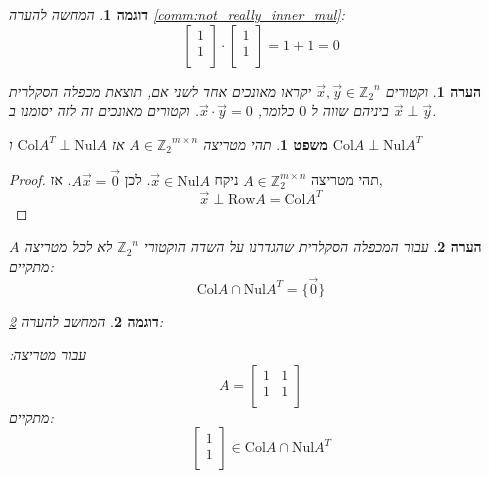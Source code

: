 \documentclass[12pt,leqno]{article}
\theoremstyle{theoremdd}
\newtheorem{theorem}{משפט}[section]
\newtheorem{example}{דוגמה}[section]
\newtheorem{comm}{הערה}[section]
\newcommand{\Zn}{{\mathbb{Z}_2}^n}
\newcommand{\Col}{\mathrm{Col}}
\newcommand{\Nul}{\mathrm{Nul}}
\begin{document}
\begin{example}
    המחשה להערה
\ref{comm:not_really_inner_mul}:
\[
    \begin{bmatrix}
    1 \\
    1 \\
    \end{bmatrix}    
    \cdot 
    \begin{bmatrix}
    1 \\
    1 \\
    \end{bmatrix} 
    = 1 + 1 = 0
\]
\end{example}

\begin{comm}
    וקטורים 
    $\vec x, \vec y \in \Zn $
    יקראו מאונכים אחד לשני
    אם,
    תוצאת מכפלה הסקלרית ביניהם שווה
    ל
    $0$
    כלומר,
    $\vec{x} \cdot \vec{y} = 0$.
    וקטורים מאונכים זה לזה יסומנו ב
    $\vec x \perp \vec y$.
\end{comm}
\begin{theorem}
    \label{the: Nul A and Col AT}
    תהי מטריצה 
    $A \in {\mathbb{Z}_2}^{m \times n }$
    אז 
    $\Col A^T \perp \Nul A$
    ו
    $\Col A \perp \Nul A^T$
\end{theorem}
\begin{proof}
    תהי 
    מטריצה
    $A \in \mathbb{Z}_2^{m \times n}$
    ניקח 
    $\vec x \in \mathrm{Nul} A$.
    לכן
    $A\vec x=\vec 0$. 
    אז,
    \[
        \vec x \perp \mathrm{Row}A=\mathrm{Col} A^T
    \]
\end{proof}
\begin{comm}
    \label{comm:not-all-A-ColA-intersection-NulA-empty}
    עבור 
    המכפלה הסקלרית שהגדרנו
    על השדה הוקטורי 
    $\Zn$
    לא לכל מטריצה 
    $A$
    מתקיים:
    \[\Col A \cap \Nul A^T = \{ \vec{0}\}\]
\end{comm}
\begin{example}
    המחשב להערה 
    \ref{comm:not-all-A-ColA-intersection-NulA-empty}:
    
    עבור מטריצה:
    \[A = 
    \begin{bmatrix}
        1 & 1 \\
        1 & 1 \\
    \end{bmatrix}\]
    מתקיים:
    \[
    \begin{bmatrix}
        1 \\
        1 \\
    \end{bmatrix}
    \in \Col A \cap \Nul A^T \]
\end{example}
\end{document}
